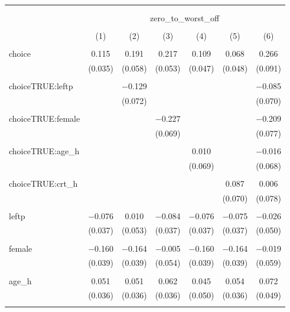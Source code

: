 
\begin{table}[!htbp] \centering 
  \caption{} 
  \label{} 
\begin{tabular}{@{\extracolsep{5pt}}lcccccc} 
\\[-1.8ex]\hline 
\hline \\[-1.8ex] 
\\[-1.8ex] & \multicolumn{6}{c}{zero\_to\_worst\_off} \\ 
\\[-1.8ex] & (1) & (2) & (3) & (4) & (5) & (6)\\ 
\hline \\[-1.8ex] 
 choice & 0.115 & 0.191 & 0.217 & 0.109 & 0.068 & 0.266 \\ 
  & (0.035) & (0.058) & (0.053) & (0.047) & (0.048) & (0.091) \\ 
  & & & & & & \\ 
 choiceTRUE:leftp &  & $-$0.129 &  &  &  & $-$0.085 \\ 
  &  & (0.072) &  &  &  & (0.070) \\ 
  & & & & & & \\ 
 choiceTRUE:female &  &  & $-$0.227 &  &  & $-$0.209 \\ 
  &  &  & (0.069) &  &  & (0.077) \\ 
  & & & & & & \\ 
 choiceTRUE:age\_h &  &  &  & 0.010 &  & $-$0.016 \\ 
  &  &  &  & (0.069) &  & (0.068) \\ 
  & & & & & & \\ 
 choiceTRUE:crt\_h &  &  &  &  & 0.087 & 0.006 \\ 
  &  &  &  &  & (0.070) & (0.078) \\ 
  & & & & & & \\ 
 leftp & $-$0.076 & 0.010 & $-$0.084 & $-$0.076 & $-$0.075 & $-$0.026 \\ 
  & (0.037) & (0.053) & (0.037) & (0.037) & (0.037) & (0.050) \\ 
  & & & & & & \\ 
 female & $-$0.160 & $-$0.164 & $-$0.005 & $-$0.160 & $-$0.164 & $-$0.019 \\ 
  & (0.039) & (0.039) & (0.054) & (0.039) & (0.039) & (0.059) \\ 
  & & & & & & \\ 
 age\_h & 0.051 & 0.051 & 0.062 & 0.045 & 0.054 & 0.072 \\ 
  & (0.036) & (0.036) & (0.036) & (0.050) & (0.036) & (0.049) \\ 
  & & & & & & \\ 

\end{tabular}
\end{table}
